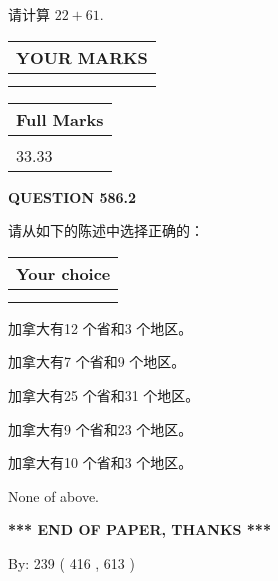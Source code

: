 \documentclass{ctexart}
\begin{document}
  
 
请计算 $ %
22 +  %
61 $.
 

 

 
  
\vspace{0.2in}
  
\noindent\begin{tabular}{|l|}
\hline
 YOUR MARKS  \\
\hline
 \\ 
 \\ 
\hline
\end{tabular}
\hspace{0.05in} \begin{tabular}{|l|}
\hline
 Full Marks  \\
\hline
 \\ 
33.33 \\
\hline
\end{tabular}
{\textbf{\Large{QUESTION
586.2 
}}}
  
  
请从如下的陈述中选择正确的：
  
  
\noindent\hspace{3.0in} \begin{tabular}{|l|}
\hline
Your choice \\
\hline
 \\ 
 \\ 
\hline
\end{tabular}
  
  
 
 
加拿大有12 个省和3 个地区。
 
 
加拿大有7 个省和9 个地区。
 
 
加拿大有25 个省和31 个地区。
 
 
加拿大有9 个省和23 个地区。
 
 
加拿大有10 个省和3 个地区。
 
 
 None of above.
 
 
   
   
 \vspace{0.2in}
 
   
   
   
   
\vspace{1.0in} 
{\textbf{\large{ *** END OF PAPER, THANKS *** }}} 
   
   
\hspace{1.0in} By: 
 239 ( 416 ,  613 )
   
\end{document}
